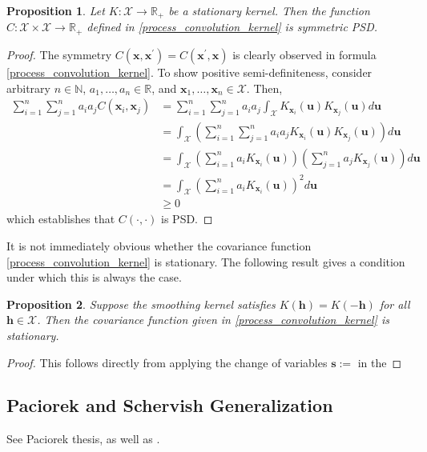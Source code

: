 \documentclass[12pt]{article}
\newcommand{\R}{\mathbb{R}}
\newcommand{\Ker}{K}
\newcommand{\covFun}{C}
\newcommand{\locSpace}{\mathcal{X}}
\newcommand{\loc}{\mathbf{x}}
\newcommand{\locTwo}{\loc^\prime}
\newcommand{\locDum}{\mathbf{u}}
\newcommand{\locLag}{\mathbf{h}}
\newcommand{\logLagDum}{\mathbf{s}}
\newtheorem{prop}{Proposition}
\begin{document}
\begin{prop} 
Let $\Ker: \locSpace \to \R_+$ be a stationary kernel. Then the function $\covFun: \locSpace \times \locSpace \to \R_+$ defined in \ref{process_convolution_kernel} is symmetric PSD. 
\end{prop}

\begin{proof} 
The symmetry $\covFun(\loc, \locTwo) = \covFun(\locTwo, \loc)$ is clearly observed in formula \ref{process_convolution_kernel}. To show positive semi-definiteness, consider arbitrary 
$n \in \mathbb{N}$, $a_1, \dots, a_n \in \R$, and $\loc_1, \dots, \loc_n \in \locSpace$. Then, 
\begin{align*}
\sum_{i = 1}^{n} \sum_{j = 1}^{n} a_i a_j \covFun(\loc_i, \loc_j) 
&= \sum_{i = 1}^{n} \sum_{j = 1}^{n} a_i a_j \int_{\locSpace} \Ker_{\loc_i}(\locDum) \Ker_{\loc_j}(\locDum) d\locDum \\
&= \int_{\locSpace} \left(\sum_{i = 1}^{n} \sum_{j = 1}^{n} a_i a_j  \Ker_{\loc_i}(\locDum) \Ker_{\loc_j}(\locDum)\right) d\locDum \\
&=  \int_{\locSpace} \left(\sum_{i = 1}^{n} a_i \Ker_{\loc_i}(\locDum)\right)  \left(\sum_{j = 1}^{n} a_j \Ker_{\loc_j}(\locDum)\right) d\locDum \\
&=  \int_{\locSpace} \left(\sum_{i = 1}^{n} a_i \Ker_{\loc_i}(\locDum)\right)^2 d\locDum \\
&\geq 0
\end{align*}
which establishes that $\covFun(\cdot, \cdot)$ is PSD. 
\end{proof} 

It is not immediately obvious whether the covariance function \ref{process_convolution_kernel} is stationary. The following result gives a condition under which this is always the case. 

\begin{prop} 
Suppose the smoothing kernel satisfies $\Ker(\locLag) = \Ker(-\locLag)$ for all $\locLag \in \locSpace$. Then the covariance function given in \ref{process_convolution_kernel} is stationary. 
\end{prop}

\begin{proof} 
This follows directly from applying the change of variables $\logLagDum := $ in the 
\end{proof}





\subsection{Paciorek and Schervish Generalization}
See Paciorek thesis, as well as \cite{Paciorek}. 
\end{document}
